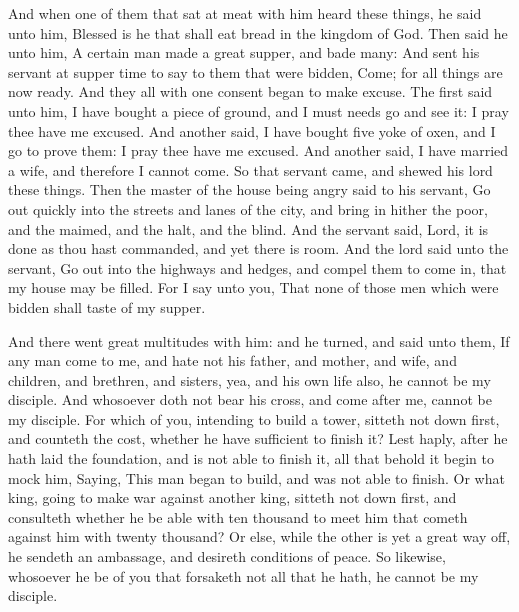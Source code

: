  And when one of them that sat at meat with him heard
these things, he said unto him, Blessed is he that shall eat bread in
the kingdom of God.  Then said he unto him, A certain man
made a great supper, and bade many:  And sent his servant
at supper time to say to them that were bidden, Come; for all things are
now ready.  And they all with one consent began to make
excuse. The first said unto him, I have bought a piece of ground, and I
must needs go and see it: I pray thee have me excused. 
And another said, I have bought five yoke of oxen, and I go to prove
them: I pray thee have me excused.  And another said, I
have married a wife, and therefore I cannot come.  So
that servant came, and shewed his lord these things. Then the master of
the house being angry said to his servant, Go out quickly into the
streets and lanes of the city, and bring in hither the poor, and the
maimed, and the halt, and the blind.  And the servant
said, Lord, it is done as thou hast commanded, and yet there is room.
 And the lord said unto the servant, Go out into the
highways and hedges, and compel them to come in, that my house may be
filled.  For I say unto you, That none of those men which
were bidden shall taste of my supper.

 And there went great multitudes with him: and he turned,
and said unto them,  If any man come to me, and hate not
his father, and mother, and wife, and children, and brethren, and
sisters, yea, and his own life also, he cannot be my disciple.
 And whosoever doth not bear his cross, and come after
me, cannot be my disciple.  For which of you, intending
to build a tower, sitteth not down first, and counteth the cost, whether
he have sufficient to finish it?  Lest haply, after he
hath laid the foundation, and is not able to finish it, all that behold
it begin to mock him,  Saying, This man began to build,
and was not able to finish.  Or what king, going to make
war against another king, sitteth not down first, and consulteth whether
he be able with ten thousand to meet him that cometh against him with
twenty thousand?  Or else, while the other is yet a great
way off, he sendeth an ambassage, and desireth conditions of peace.
 So likewise, whosoever he be of you that forsaketh not
all that he hath, he cannot be my disciple.

